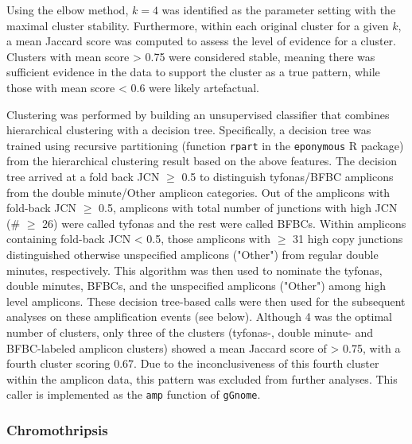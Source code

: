 \documentclass[phd,tocprelim]{cornell}
\newcommand{\ttt}[1]{\texttt{#1}}
\begin{document}
Using the elbow method, $k=4$ was identified as the parameter setting with the maximal cluster stability.  Furthermore, within each original cluster for a given $k$, a mean Jaccard score was computed to assess the level of evidence for a cluster. Clusters with mean score > 0.75 were considered stable, meaning there was sufficient evidence in the data to support the cluster as a true pattern, while those with mean score < 0.6 were likely artefactual.

Clustering was performed by building an unsupervised classifier that combines hierarchical clustering with a decision tree.  Specifically, a decision tree was trained using recursive partitioning (function \texttt{rpart} in the \texttt{eponymous} R package) from the hierarchical clustering result based on the above features. The decision tree arrived at a fold back JCN $\ge$ 0.5 to distinguish tyfonas/BFBC amplicons from the double minute/Other amplicon categories. Out of the amplicons with fold-back JCN $\geq$ 0.5, amplicons with total number of junctions with high JCN (\# $\geq$ 26) were called tyfonas and the rest were called BFBCs. Within amplicons containing fold-back JCN < 0.5, those amplicons with $\geq$ 31 high copy junctions distinguished otherwise unspecified amplicons ("Other") from regular double minutes, respectively. This algorithm was then used to nominate the tyfonas, double minutes, BFBCs, and the unspecified amplicons ("Other") among high level amplicons. These decision tree-based calls were then used for the subsequent analyses on these amplification events (see below). Although 4 was the optimal number of clusters, only three of the clusters (tyfonas-, double minute- and BFBC-labeled amplicon clusters) showed a mean Jaccard score of > 0.75, with a fourth cluster scoring 0.67. Due to the inconclusiveness of this fourth cluster within the amplicon data, this pattern was excluded from further analyses. This caller is implemented as the \ttt{amp} function of \ttt{gGnome}.

\subsubsection*{Chromothripsis}
\end{document}
